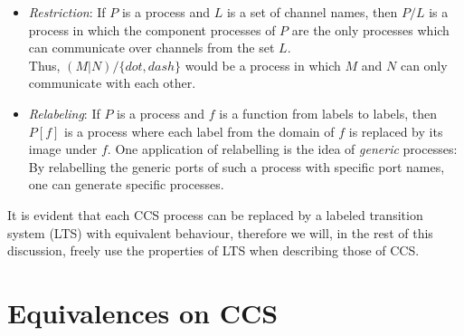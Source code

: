 \documentclass{article}
\begin{document}
\begin{itemize}
\item \emph{Restriction}: If $P$ is a process and $L$ is a set of
  channel names, then $P/L$ is a process in which the component
  processes of $P$
  are the only processes which can communicate over channels from the
  set $L$.\\
  Thus, $(M|N)/\{dot,dash\}$ would be a process in which $M$ and $N$
  can only communicate with each other.

\item \emph{Relabeling}: If $P$ is a process and $f$ is a function
  from labels to labels, then $P[f]$ is a process where each label
  from the domain of $f$ is replaced by its image under $f$. One
  application of relabelling is the idea of \emph{generic} processes:
  By relabelling the generic ports of such a process with specific
  port names, one can generate specific processes.

\end{itemize}

It is evident that each CCS process can be replaced by a labeled
transition system (LTS) with equivalent behaviour, therefore we will,
in the rest of this discussion, freely use the properties of LTS when
describing those of CCS.

\section{Equivalences on CCS}
\end{document}
